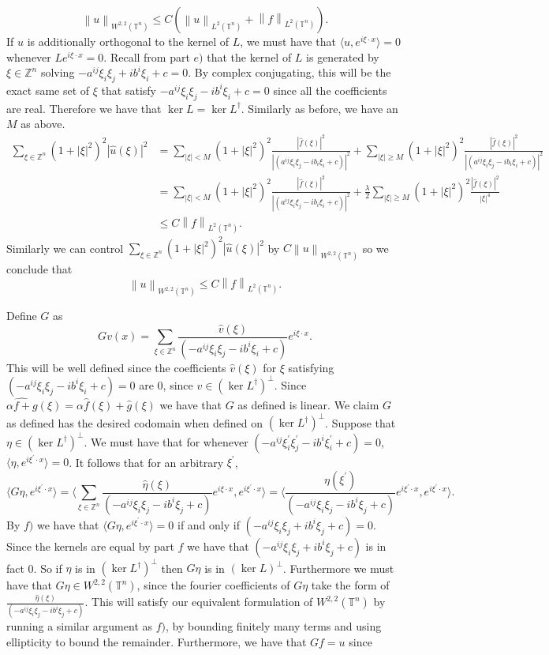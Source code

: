 \documentclass[12pt, a4paper]{article}
\theoremstyle{definition}
\newcommand{\Z}{\mathbb{Z}}                           %
\newcommand{\T}{\mathbb{T}}                         %
\newcommand{\lan}{\langle}
\newcommand{\ran}{\rangle}
\newcommand{\norm}[1]{\left\lVert#1\right\rVert}
\newcommand{\inn}[1]{\lan#1\ran}
\begin{document}
$$\norm{u}_{W^{2,2}(\T^n)} \leq C \left( \norm{u}_{L^2(\T^n)} + \norm{f}_{L^2(\T^n)}\right).$$
If $u$ is additionally orthogonal to the kernel of $L$, we must have that $\inn{u , e^{i \xi \cdot x}} = 0$ whenever $Le^{i \xi \cdot x} = 0$. Recall from part $e)$ that the kernel of $L$ is generated by $\xi \in \Z^n $ solving $-a^{ij} \xi_i \xi_j + i b^i \xi_i + c = 0$. By complex conjugating, this will be the exact same set of $\xi$ that satisfy $-a^{ij} \xi_i \xi_j - i b^i \xi_i + c = 0$ since all the coefficients are real. Therefore we have that $\ker L = \ker L^\dagger$. 
Similarly as before, we have an $M$ as above. 
\begin{align*}
\sum_{\xi \in \Z^n} (1+|\xi|^2)^2 |\hat{u}(\xi)|^2 
&= \sum_{|\xi | < M} (1+|\xi|^2)^2\frac{|\hat{f}(\xi)|^2}{|(a^{ij} \xi_i\xi_j - i b_i\xi_i + c )|^2} +\sum_{|\xi| \geq M} (1+|\xi|^2)^2 \frac{|\hat{f}(\xi)|^2}{|(a^{ij} \xi_i\xi_j - i b_i\xi_i + c )|^2}
\\ & = \sum_{|\xi | < M} (1+|\xi|^2)^2\frac{|\hat{f}(\xi)|^2}{|(a^{ij} \xi_i\xi_j - i b_i\xi_i + c )|^2} + \frac{\lambda}{2} \sum_{|\xi| \geq M} (1+|\xi|^2)^2\frac{|\hat{f}(\xi)|^2}{|\xi|^4}
\\ & \leq C\norm{f}_{L^2(\T^n)}.  
\end{align*}
Similarly we can control $\sum_{\xi \in \Z^n} (1+|\xi|^2)^2 |\hat{u}(\xi)|^2$ by $C \norm{u}_{W^{2,2}(\T^n)}$ so we conclude that 
$$\norm{u}_{W^{2,2}(\T^n)} \leq C \norm{f}_{L^2(\T^n)}. $$
\item Define $G$ as $$Gv(x) = \sum_{\xi \in \Z^n} \frac{\hat{v}(\xi)}{(-a^{ij} \xi_i \xi_j - i b^{i} \xi_i + c)} e^{i \xi \cdot x}.$$
This will be well defined since the coefficients $\hat{v}(\xi)$ for $\xi$ satisfying $(-a^{ij} \xi_i \xi_j - i b^{i} \xi_i + c) =0$ are 0, since $v\in (\ker L^\dagger)^\perp$. 
Since $\widehat{\alpha f + g}(\xi) = \alpha \hat{f} (\xi)+ \hat{g}(\xi)$ we have that $G$ as defined is linear. We claim $G$ as defined has the desired codomain when defined on $(\ker L^\dagger)^\perp$. Suppose that $\eta \in (\ker L^\dagger)^\perp$. We must have that for whenever $(-a^{ij} \xi^\prime_i \xi^\prime_j - ib^{i}\xi^\prime_i +c ) = 0$, $\inn{\eta, e^{i \xi^\prime \cdot x}} =0$. It follows that for an arbitrary $\xi^\prime$, 
$$\inn{G\eta, e^{i \xi^\prime \cdot x}} = \inn{\sum_{\xi \in \Z^n} \frac{\hat{\eta}(\xi)}{(-a^{ij}\xi_i \xi_j - i b^{i}\xi_j + c)}e^{i \xi \cdot x},e^{i \xi^\prime \cdot x}}= \inn{\frac{{\eta}(\xi^\prime)}{(-a^{ij}\xi_i \xi_j - i b^{i}\xi_j + c)} e^{i \xi^\prime \cdot x}, e^{i \xi^\prime \cdot x}}.$$
By $f)$ we have that $\inn{G\eta, e^{i \xi^\prime \cdot x} } = 0$ if and only if $(-a^{ij}\xi_i \xi_j + i b^{i}\xi_j + c) = 0$. Since the kernels are equal by part $f$ we have that $(-a^{ij}\xi_i \xi_j + i b^{i}\xi_j + c)$ is in fact 0. So if $\eta$ is in $(\ker L^\dagger)^\perp$ then $G\eta$ is in $(\ker L)^\perp$. Furthermore we must have that $G\eta \in W^{2,2}(\T^n)$, since the fourier coefficients of $G\eta$ take the form of $\frac{\hat{\eta}(\xi)}{(-a^{ij}\xi_i \xi_j - i b^{i}\xi_j + c)}$. This will satisfy our equivalent formulation of $W^{2,2}(\T^n)$ by running a similar argument as $f)$, by bounding finitely many terms and using ellipticity to bound the remainder. Furthermore, we have that $Gf = u$ since
\end{document}
